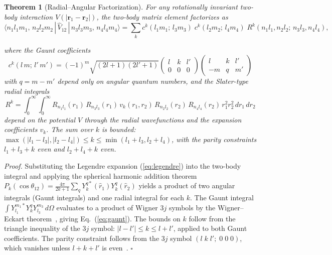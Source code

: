 \documentclass[twocolumn,pra,amsmath,amssymb,superscriptaddress]{revtex4-2}
\begin{document}
\begin{widetext}
\noindent\textbf{Theorem 1} (Radial--Angular Factorization).
\textit{For any rotationally invariant two-body interaction $V(|\mathbf{r}_1 - \mathbf{r}_2|)$, the two-body matrix element factorizes as}
\begin{equation}
  \langle n_1 l_1 m_1,\, n_2 l_2 m_2 \,|\, \hat{V}_{12} \,|\, n_3 l_3 m_3,\, n_4 l_4 m_4 \rangle
  = \sum_k c^k(l_1 m_1;\, l_3 m_3)\; c^k(l_2 m_2;\, l_4 m_4)\; R^k(n_1 l_1, n_2 l_2;\, n_3 l_3, n_4 l_4),
  \label{eq:factorization}
\end{equation}
\end{widetext}
\textit{where the Gaunt coefficients}
\begin{equation}
  c^k(l\, m;\, l'\, m') = (-1)^m \sqrt{(2l+1)(2l'+1)}
  \begin{pmatrix} l & k & l' \\ 0 & 0 & 0 \end{pmatrix}
  \begin{pmatrix} l & k & l' \\ -m & q & m' \end{pmatrix}
  \label{eq:gaunt}
\end{equation}
\textit{with $q = m - m'$ depend only on angular quantum numbers, and
the Slater-type radial integrals}
\begin{equation}
  R^k = \int_0^\infty \!\!\int_0^\infty
  R_{n_1 l_1}(r_1)\, R_{n_3 l_3}(r_1)\,
  v_k(r_1, r_2)\,
  R_{n_2 l_2}(r_2)\, R_{n_4 l_4}(r_2)\,
  r_1^2 r_2^2\, dr_1\, dr_2
  \label{eq:slater}
\end{equation}
\textit{depend on the potential $V$ through the radial wavefunctions
and the expansion coefficients $v_k$.  The sum over $k$ is bounded:
$\max(|l_1 - l_3|, |l_2 - l_4|) \leq k \leq \min(l_1 + l_3, l_2 + l_4)$,
with the parity constraints $l_1 + l_3 + k$ even and $l_2 + l_4 + k$
even.}

\textit{Proof.}  Substituting the Legendre expansion
(\ref{eq:legendre}) into the two-body integral and applying the
spherical harmonic addition theorem
$P_k(\cos\theta_{12}) = \frac{4\pi}{2k+1} \sum_q Y_k^{q*}(\hat{r}_1) Y_k^q(\hat{r}_2)$
yields a product of two angular integrals (Gaunt integrals) and one
radial integral for each $k$.  The Gaunt integral
$\int Y_{l_1}^{m_1*} Y_k^q Y_{l_3}^{m_3}\, d\Omega$ evaluates to
a product of Wigner 3$j$ symbols by the Wigner--Eckart
theorem~\cite{Messiah1962}, giving Eq.~(\ref{eq:gaunt}).  The bounds
on $k$ follow from the triangle inequality of the 3$j$ symbol:
$|l - l'| \leq k \leq l + l'$, applied to both Gaunt coefficients.
The parity constraint follows from the 3$j$ symbol
$(l\; k\; l';\; 0\; 0\; 0)$, which vanishes unless $l + k + l'$ is
even~\cite{CondonShortley1935}.  \hfill$\square$
\end{document}
